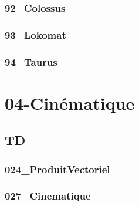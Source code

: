 \subsection{92\_Colossus}
\graphicspath{{../03-Lois entrée sortie/TD/Transmetteurs/92_Colossus/images/}{../03-Lois entrée sortie/TD/Transmetteurs/92_Colossus/}{../Style/png/}}


\subsection{93\_Lokomat}
\graphicspath{{../03-Lois entrée sortie/TD/Transmetteurs/93_Lokomat/images/}{../03-Lois entrée sortie/TD/Transmetteurs/93_Lokomat/}{../Style/png/}}


\subsection{94\_Taurus}
\graphicspath{{../03-Lois entrée sortie/TD/Transmetteurs/94_Taurus/images/}{../03-Lois entrée sortie/TD/Transmetteurs/94_Taurus/}{../Style/png/}}


\clearpage
\chapter{04-Cinématique}

\section{TD}

\subsection{024\_ProduitVectoriel}
\graphicspath{{../04-Cinématique/TD/024_ProduitVectoriel/images/}{../04-Cinématique/TD/024_ProduitVectoriel/}{../Style/png/}}


\subsection{027\_Cinematique}
\graphicspath{{../04-Cinématique/TD/027_Cinematique/images/}{../04-Cinématique/TD/027_Cinematique/}{../Style/png/}}


